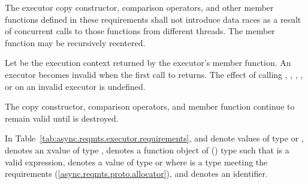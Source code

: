 \pnum
 The executor copy constructor, comparison operators, and other member functions defined in these requirements shall not introduce data races as a result of concurrent calls to those functions from different threads.
The member function  may be recursively reentered.

\pnum
Let  be the execution context returned by the executor's  member function. An executor becomes invalid when the first call to  returns. The effect of calling , , , , or  on an invalid executor is undefined. \begin{note} The copy constructor, comparison operators, and  member function continue to remain valid until  is destroyed. \end{note}

\pnum
In Table~\ref{tab:async.reqmts.executor.requirements},
 and  denote values of type  or ,
 denotes an xvalue of type ,
 denotes a function object of  () type  such that  is a valid expression,
 denotes a value of type  or 
where  is a type meeting the  requirements (\ref{async.reqmts.proto.allocator}),
and  denotes an identifier.

